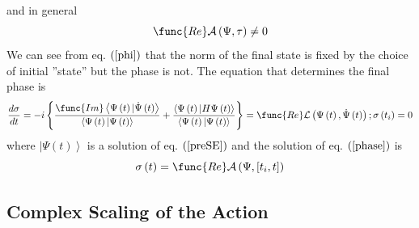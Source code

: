 \documentclass[aps,preprint]{revtex4}
\begin{document}
and in general 
\begin{equation}
\func{Re}\mathcal{A}\left( \Psi,\tau\right) \neq0
\end{equation}
We can see from eq. $\left( \ref{phi}\right) $ that the norm of the final
state is fixed by the choice of initial ''state'' but the phase is not. The
equation that determines the final phase is 
\begin{equation}
\frac{d\sigma}{dt}=-i\left\{ \frac{\func{Im}\left\langle \Psi\left( t\right)
|\dot{\Psi}\left( t\right) \right\rangle }{\left\langle \Psi\left( t\right)
|\Psi\left( t\right) \right\rangle }+\frac {\left\langle \Psi\left( t\right)
|H\Psi\left( t\right) \right\rangle }{\left\langle \Psi\left( t\right)
|\Psi\left( t\right) \right\rangle }\right\} =\func{Re}\mathcal{L}\left(
\Psi\left( t\right) ,\dot{\Psi}\left( t\right) \right) ;\sigma\left(
t_{i}\right) =0  \label{phase}
\end{equation}
where $\left| \Psi\left( t\right) \right\rangle $ is a solution of eq. $%
\left( \ref{preSE}\right) $ and the solution of eq. $\left( \ref{phase}%
\right) $ is 
\begin{equation}
\sigma\left( t\right) =\func{Re}\mathcal{A}\left( \Psi,\left[ t_{i},t\right]
\right)
\end{equation}

\subsection{Complex Scaling of the Action}
\end{document}
